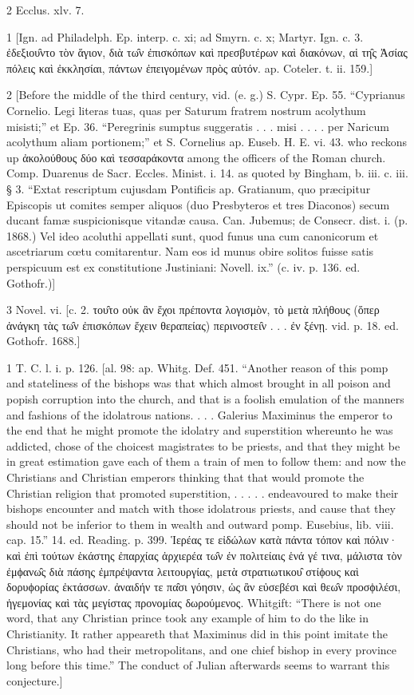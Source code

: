 2
Ecclus. xlv. 7.

1
[Ign. ad Philadelph. Ep. interp. c. xi; ad Smyrn. c. x; Martyr. Ign. c. 3. ἐδεξιου̑ντο τὸν ἅγιον, διὰ τω̑ν ἐπισκόπων καὶ πρεσβυτέρων καὶ διακόνων, αἱ τη̑ς Ἀσίας πόλεις καὶ ἐκκλησίαι, πάντων ἐπειγομένων πρὸς αὐτόν. ap. Coteler. t. ii. 159.]

2
[Before the middle of the third century, vid. (e. g.) S. Cypr. Ep. 55. “Cyprianus Cornelio. Legi literas tuas, quas per Saturum fratrem nostrum acolythum misisti;” et Ep. 36. “Peregrinis sumptus suggeratis . . . misi . . . . per Naricum acolythum aliam portionem;” et S. Cornelius ap. Euseb. H. E. vi. 43. who reckons up ἀκολούθους δύο καὶ τεσσαράκοντα among the officers of the Roman church. Comp. Duarenus de Sacr. Eccles. Minist. i. 14. as quoted by Bingham, b. iii. c. iii. § 3. “Extat rescriptum cujusdam Pontificis ap. Gratianum, quo præcipitur Episcopis ut comites semper aliquos (duo Presbyteros et tres Diaconos) secum ducant famæ suspicionisque vitandæ causa. Can. Jubemus; de Consecr. dist. i. (p. 1868.) Vel ideo acoluthi appellati sunt, quod funus una cum canonicorum et ascetriarum cœtu comitarentur. Nam eos id munus obire solitos fuisse satis perspicuum est ex constitutione Justiniani: Novell. ix.” (c. iv. p. 136. ed. Gothofr.)]

3
Novel. vi. [c. 2. του̑το οὐκ ἂν ἔχοι πρέποντα λογισμὸν, τὸ μετὰ πλήθους (ὅπερ ἀνάγκη τὰς τω̑ν ἐπισκόπων ἔχειν θεραπείας) περινοστει̑ν . . . ἐν ξένῃ. vid. p. 18. ed. Gothofr. 1688.]

1
T. C. l. i. p. 126. [al. 98: ap. Whitg. Def. 451. “Another reason of this pomp and stateliness of the bishops was that which almost brought in all poison and popish corruption into the church, and that is a foolish emulation of the manners and fashions of the idolatrous nations. . . . Galerius Maximinus the emperor to the end that he might promote the idolatry and superstition whereunto he was addicted, chose of the choicest magistrates to be priests, and that they might be in great estimation gave each of them a train of men to follow them: and now the Christians and Christian emperors thinking that that would promote the Christian religion that promoted superstition, . . . . . endeavoured to make their bishops encounter and match with those idolatrous priests, and cause that they should not be inferior to them in wealth and outward pomp. Eusebius, lib. viii. cap. 15.” 14. ed. Reading. p. 399. Ἱερέας τε εἰδώλων κατὰ πάντα τόπον καὶ πόλιν· καὶ ἐπὶ τούτων ἑκάστης ἐπαρχίας ἀρχιερέα τω̑ν ἐν πολιτείαις ἑνά γέ τινα, μάλιστα τὸν ἐμϕανω̑ς διὰ πάσης ἐμπρέψαντα λειτουργίας, μετὰ στρατιωτικου̑ στίϕους καὶ δορυϕορίας ἐκτάσσων. ἀναιδήν τε πα̑σι γόησιν, ὡς ἂν εὐσεβέσι καὶ θεω̑ν προσϕιλέσι, ἡγεμονίας καὶ τὰς μεγίστας προνομίας δωρούμενος. Whitgift: “There is not one word, that any Christian prince took any example of him to do the like in Christianity. It rather appeareth that Maximinus did in this point imitate the Christians, who had their metropolitans, and one chief bishop in every province long before this time.” The conduct of Julian afterwards seems to warrant this conjecture.]

